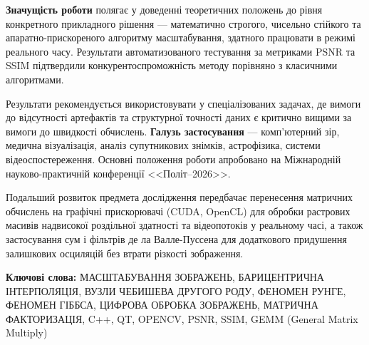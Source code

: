 \textbf{Значущість роботи} полягає у доведенні теоретичних положень до рівня конкретного прикладного рішення --- математично строгого, чисельно стійкого та апаратно-прискореного алгоритму масштабування, здатного працювати в режимі реального часу. Результати автоматизованого тестування за метриками PSNR та SSIM підтвердили конкурентоспроможність методу порівняно з класичними алгоритмами.

Результати рекомендується використовувати у спеціалізованих задачах, де вимоги до відсутності артефактів та структурної точності даних є критично вищими за вимоги до швидкості обчислень. \textbf{Галузь застосування} --- комп'ютерний зір, медична візуалізація, аналіз супутникових знімків, астрофізика, системи відеоспостереження. Основні положення роботи апробовано на Міжнародній науково-практичній конференції <<Політ--2026>>.

Подальший розвиток предмета дослідження передбачає перенесення матричних обчислень на графічні прискорювачі (CUDA, OpenCL) для обробки растрових масивів надвисокої роздільної здатності та відеопотоків у реальному часі, а також застосування сум і фільтрів де ла Валле-Пуссена для додаткового придушення залишкових осциляцій без втрати різкості зображення.

\medskip
\textbf{Ключові слова:}
МАСШТАБУВАННЯ ЗОБРАЖЕНЬ, БАРИЦЕНТРИЧНА ІНТЕРПОЛЯЦІЯ, ВУЗЛИ ЧЕБИШЕВА ДРУГОГО РОДУ, ФЕНОМЕН РУНГЕ, ФЕНОМЕН ГІББСА, ЦИФРОВА ОБРОБКА ЗОБРАЖЕНЬ, МАТРИЧНА ФАКТОРИЗАЦІЯ, C++, QT, OPENCV, PSNR, SSIM, GEMM (General Matrix Multiply)

